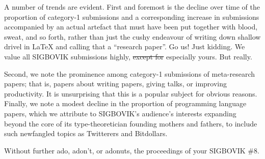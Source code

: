 \documentclass[12pt]{article}
\begin{document}
A number of trends are evident. First and foremost is the decline over time of the proportion of category-1 submissions and a corresponding increase in submissions accompanied by an actual artefact that must have been put together with blood, sweat, and so forth, rather than just the cushy endeavour of writing down shallow drivel in LaTeX and calling that a ``research paper''. Go us! Just kidding. We value all SIGBOVIK submissions highly, \sout{except for} especially yours. But really.

Second, we note the prominence among category-1 submissions of meta-research papers; that is, papers about writing papers, giving talks, or improving productivity. It is unsurprising that this is a popular subject for obvious reasons. Finally, we note a modest decline in the proportion of programming language papers, which we attribute to SIGBOVIK's audience's interests expanding beyond the core of its type-theoretician founding mothers and fathers, to include such newfangled topics as Twitterers and Bitdollars.

Without further ado, adon't, or adonuts, the proceedings of your SIGBOVIK \#8.

\thispagestyle{empty}
\end{document}
